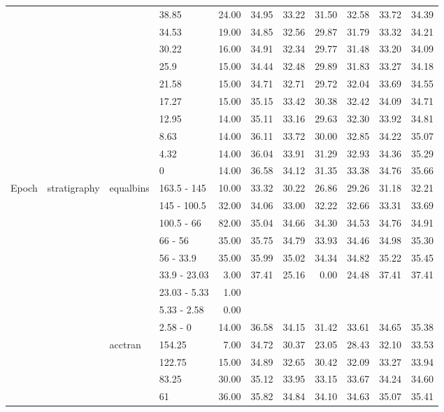 \begin{longtable}{llllrrrrrrr}
   &  &  & 38.85 & 24.00 & 34.95 & 33.22 & 31.50 & 32.58 & 33.72 & 34.39 \\ 
   &  &  & 34.53 & 19.00 & 34.85 & 32.56 & 29.87 & 31.79 & 33.32 & 34.21 \\ 
   &  &  & 30.22 & 16.00 & 34.91 & 32.34 & 29.77 & 31.48 & 33.20 & 34.09 \\ 
   &  &  & 25.9 & 15.00 & 34.44 & 32.48 & 29.89 & 31.83 & 33.27 & 34.18 \\ 
   &  &  & 21.58 & 15.00 & 34.71 & 32.71 & 29.72 & 32.04 & 33.69 & 34.55 \\ 
   &  &  & 17.27 & 15.00 & 35.15 & 33.42 & 30.38 & 32.42 & 34.09 & 34.71 \\ 
   &  &  & 12.95 & 14.00 & 35.11 & 33.16 & 29.63 & 32.30 & 33.92 & 34.81 \\ 
   &  &  & 8.63 & 14.00 & 36.11 & 33.72 & 30.00 & 32.85 & 34.22 & 35.07 \\ 
   &  &  & 4.32 & 14.00 & 36.04 & 33.91 & 31.29 & 32.93 & 34.36 & 35.29 \\ 
   &  &  & 0 & 14.00 & 36.58 & 34.12 & 31.35 & 33.38 & 34.76 & 35.66 \\ 
  Epoch & stratigraphy & equalbins & 163.5 - 145 & 10.00 & 33.32 & 30.22 & 26.86 & 29.26 & 31.18 & 32.21 \\ 
   &  &  & 145 - 100.5 & 32.00 & 34.06 & 33.00 & 32.22 & 32.66 & 33.31 & 33.69 \\ 
   &  &  & 100.5 - 66 & 82.00 & 35.04 & 34.66 & 34.30 & 34.53 & 34.76 & 34.91 \\ 
   &  &  & 66 - 56 & 35.00 & 35.75 & 34.79 & 33.93 & 34.46 & 34.98 & 35.30 \\ 
   &  &  & 56 - 33.9 & 35.00 & 35.99 & 35.02 & 34.34 & 34.82 & 35.22 & 35.45 \\ 
   &  &  & 33.9 - 23.03 & 3.00 & 37.41 & 25.16 & 0.00 & 24.48 & 37.41 & 37.41 \\ 
   &  &  & 23.03 - 5.33 & 1.00 &  &  &  &  &  &  \\ 
   &  &  & 5.33 - 2.58 & 0.00 &  &  &  &  &  &  \\ 
   &  &  & 2.58 - 0 & 14.00 & 36.58 & 34.15 & 31.42 & 33.61 & 34.65 & 35.38 \\ 
   &  & acctran & 154.25 & 7.00 & 34.72 & 30.37 & 23.05 & 28.43 & 32.10 & 33.53 \\ 
   &  &  & 122.75 & 15.00 & 34.89 & 32.65 & 30.42 & 32.09 & 33.27 & 33.94 \\ 
   &  &  & 83.25 & 30.00 & 35.12 & 33.95 & 33.15 & 33.67 & 34.24 & 34.60 \\ 
   &  &  & 61 & 36.00 & 35.82 & 34.84 & 34.10 & 34.63 & 35.07 & 35.41 \\ 

\end{longtable}

